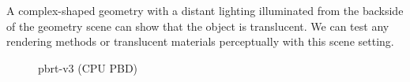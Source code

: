 \documentclass[letterpaper,12pt]{article}
\begin{document}
A complex-shaped geometry with a distant lighting illuminated from the backside of the geometry scene can show that the object is translucent. We can test any rendering methods or translucent materials perceptually with this scene setting.

\begin{figure}[H]
    \centering
    \caption{pbrt-v3 (CPU PBD)}%
    \label{}%
\end{figure}
\end{document}
